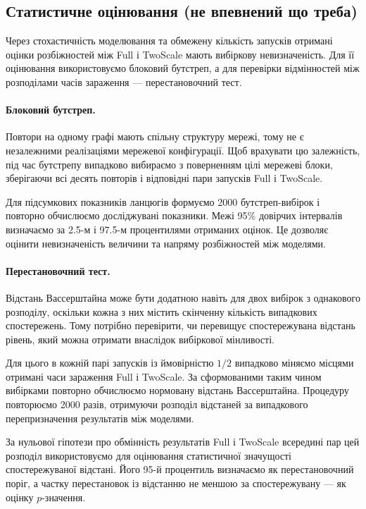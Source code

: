 \subsection{Статистичне оцінювання (не впевнений що треба)}

Через стохастичність моделювання та обмежену
кількість запусків отримані оцінки розбіжностей
між Full і TwoScale мають вибіркову невизначеність.
Для її оцінювання використовуємо блоковий бутстреп,
а для перевірки відмінностей між розподілами
часів зараження --- перестановочний тест.

\paragraph{Блоковий бутстреп.}
Повтори на одному графі мають спільну структуру
мережі, тому не є незалежними реалізаціями
мережевої конфігурації. Щоб врахувати цю
залежність, під час бутстрепу випадково
вибираємо з поверненням цілі мережеві блоки,
зберігаючи всі десять повторів і відповідні
пари запусків Full і TwoScale.

Для підсумкових показників ланцюгів формуємо
2000 бутстреп-вибірок і повторно обчислюємо
досліджувані показники. Межі 95\% довірчих
інтервалів визначаємо за 2.5-м і 97.5-м
процентилями отриманих оцінок.
Це дозволяє оцінити невизначеність величини
та напряму розбіжностей між моделями.

\paragraph{Перестановочний тест.}
Відстань Вассерштайна може бути додатною
навіть для двох вибірок з однакового розподілу,
оскільки кожна з них містить скінченну
кількість випадкових спостережень.
Тому потрібно перевірити, чи перевищує
спостережувана відстань рівень, який
можна отримати внаслідок вибіркової
мінливості.

Для цього в кожній парі запусків
із ймовірністю $1/2$ випадково міняємо
місцями отримані часи зараження
Full і TwoScale. За сформованими таким
чином вибірками повторно обчислюємо
нормовану відстань Вассерштайна.
Процедуру повторюємо 2000 разів,
отримуючи розподіл відстаней за випадкового
перепризначення результатів між моделями.

За нульової гіпотези про обмінність
результатів Full і TwoScale всередині пар
цей розподіл використовуємо для оцінювання
статистичної значущості спостережуваної
відстані. Його 95-й процентиль визначаємо
як перестановочний поріг, а частку
перестановок із відстанню не меншою
за спостережувану --- як оцінку
$p$-значення.

